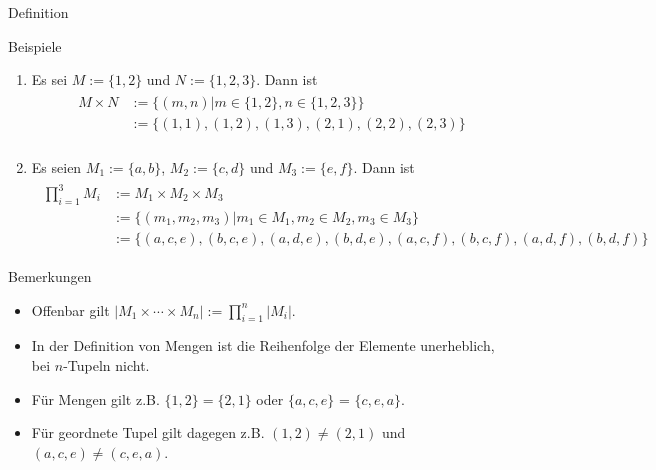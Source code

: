 \documentclass[
  8pt,
  ignorenonframetext,
]{beamer}
\providecommand{\tightlist}{%
  \setlength{\itemsep}{0pt}\setlength{\parskip}{0pt}}
\begin{document}
\begin{frame}{Definition}
\protect\hypertarget{definition-1}{}
\footnotesize

Beispiele

\begin{enumerate}
[(1)]
\tightlist
\item
  Es sei \(M := \{1,2\}\) und \(N := \{1,2,3\}\). Dann ist \begin{align}
  \begin{split}
  M \times N
  & := \{(m,n)| m \in \{1,2\}, n \in \{1,2,3\}\}    \\
  & := \{(1,1), (1,2), (1,3), (2,1), (2,2), (2,3)\} \\
  \end{split}
  \end{align}
\item
  Es seien \(M_1 := \{a,b\}\), \(M_2 := \{c,d\}\) und
  \(M_3 := \{e,f\}\). Dann ist \begin{align}
  \begin{split}
  \prod_{i=1}^3 M_i
  & := M_1 \times M_2 \times M_3                                           \\
  & := \{(m_1,m_2,m_3)|m_1 \in M_1, m_2\in M_2, m_3 \in M_3\}              \\
  & := \{(a,c,e),(b,c,e),(a,d,e),(b,d,e),(a,c,f),(b,c,f),(a,d,f),(b,d,f)\}
  \end{split}
  \end{align}
\end{enumerate}

Bemerkungen

\begin{itemize}
\tightlist
\item
  Offenbar gilt
  \(|M_1 \times \cdots \times M_n| := \prod_{i=1}^n |M_i|\).
\item
  In der Definition von Mengen ist die Reihenfolge der Elemente
  unerheblich, bei \(n\)-Tupeln nicht.
\item
  Für Mengen gilt z.B. \(\{1,2\} = \{2,1\}\) oder \(\{a,c,e\}\) =
  \(\{c,e,a\}\).
\item
  Für geordnete Tupel gilt dagegen z.B. \((1,2)\neq (2,1)\) und
  \((a,c,e) \neq (c,e,a)\).
\end{itemize}
\end{frame}
\end{document}
